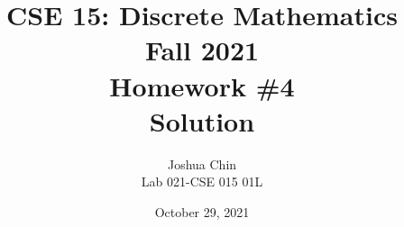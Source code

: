\documentclass[11pt]{article}
\begin{document}
\author{Joshua Chin\\
Lab 021-CSE 015 01L}

\title{CSE 15: Discrete Mathematics\\
Fall 2021\\
Homework \#4\\
Solution}

\date{October 29, 2021}
\maketitle

\begin{enumerate}


\end{enumerate}
\end{document}
